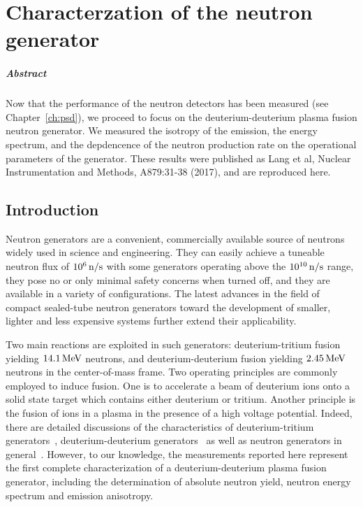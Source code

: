 
\chapter{Characterzation of the neutron generator}\label{ch:ng}

\paragraph{Abstract} Now that the performance of the neutron detectors has been measured (see Chapter~\ref{ch:psd}), we proceed to focus on the deuterium-deuterium plasma fusion neutron generator. We measured the isotropy of the emission, the energy spectrum, and the depdencence of the neutron production rate on the operational parameters of the generator. These results were published as Lang et al, Nuclear Instrumentation and Methods, A879:31-38 (2017), and are reproduced here.

\section{Introduction}

Neutron generators are a convenient, commercially available source of neutrons widely used in science and engineering. They can easily achieve a tuneable neutron flux of $10^6\,\mathrm{n/s}$ with some generators operating above the $10^{10}\,\mathrm{n/s}$ range, they pose no or only minimal safety concerns when turned off, and they are available in a variety of configurations. The latest advances in the field of compact sealed-tube neutron generators toward the development of smaller, lighter and less expensive systems further extend their applicability.

Two main reactions are exploited in such generators: deuterium-tritium fusion yielding $14.1\,\mathrm{MeV}$ neutrons, and deuterium-deuterium fusion yielding $2.45\,\mathrm{MeV}$ neutrons in the center-of-mass frame. Two operating principles are commonly employed to induce fusion. One is to accelerate a beam of deuterium ions onto a solid state target which contains either deuterium or tritium. Another principle is the fusion of ions in a plasma in the presence of a high voltage potential. Indeed, there are detailed discussions of the characteristics of deuterium-tritium generators~\cite{Guillame:1971}, deuterium-deuterium generators~\cite{Miley:1997,Miley:1999,Miley:2000} as well as neutron generators in general~\cite{CRC,Chernikova:2014}. However, to our knowledge, the measurements reported here represent the first complete characterization of a deuterium-deuterium plasma fusion generator, including the determination of absolute neutron yield, neutron energy spectrum and emission anisotropy.

